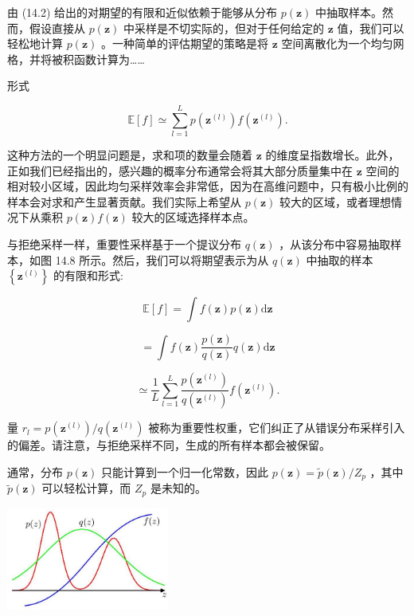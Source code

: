 \documentclass[10pt]{report}
\begin{document}
由 (14.2) 给出的对期望的有限和近似依赖于能够从分布 \(p\left( \mathbf{z}\right)\) 中抽取样本。然而，假设直接从 \(p\left( \mathbf{z}\right)\) 中采样是不切实际的，但对于任何给定的 \(\mathbf{z}\) 值，我们可以轻松地计算 \(p\left( \mathbf{z}\right)\) 。一种简单的评估期望的策略是将 \(\mathbf{z}\) 空间离散化为一个均匀网格，并将被积函数计算为……

形式

\[
\mathbb{E}\left\lbrack  f\right\rbrack   \simeq  \mathop{\sum }\limits_{{l = 1}}^{L}p\left( {\mathbf{z}}^{\left( l\right) }\right) f\left( {\mathbf{z}}^{\left( l\right) }\right) . \tag{14.18}
\]

这种方法的一个明显问题是，求和项的数量会随着 \(\mathbf{z}\) 的维度呈指数增长。此外，正如我们已经指出的，感兴趣的概率分布通常会将其大部分质量集中在 \(\mathbf{z}\) 空间的相对较小区域，因此均匀采样效率会非常低，因为在高维问题中，只有极小比例的样本会对求和产生显著贡献。我们实际上希望从 \(p\left( \mathbf{z}\right)\) 较大的区域，或者理想情况下从乘积 \(p\left( \mathbf{z}\right) f\left( \mathbf{z}\right)\) 较大的区域选择样本点。

与拒绝采样一样，重要性采样基于一个提议分布 \(q\left( \mathbf{z}\right)\) ，从该分布中容易抽取样本，如图 14.8 所示。然后，我们可以将期望表示为从 \(q\left( \mathbf{z}\right)\) 中抽取的样本 \(\left\{  {\mathbf{z}}^{\left( l\right) }\right\}\) 的有限和形式:

\[
\mathbb{E}\left\lbrack  f\right\rbrack   = \int f\left( \mathbf{z}\right) p\left( \mathbf{z}\right) \mathrm{d}\mathbf{z}
\]

\[
= \int f\left( \mathbf{z}\right) \frac{p\left( \mathbf{z}\right) }{q\left( \mathbf{z}\right) }q\left( \mathbf{z}\right) \mathrm{d}\mathbf{z}
\]

\[
\simeq  \frac{1}{L}\mathop{\sum }\limits_{{l = 1}}^{L}\frac{p\left( {\mathbf{z}}^{\left( l\right) }\right) }{q\left( {\mathbf{z}}^{\left( l\right) }\right) }f\left( {\mathbf{z}}^{\left( l\right) }\right) . \tag{14.19}
\]

量 \({r}_{l} = p\left( {\mathbf{z}}^{\left( l\right) }\right) /q\left( {\mathbf{z}}^{\left( l\right) }\right)\) 被称为重要性权重，它们纠正了从错误分布采样引入的偏差。请注意，与拒绝采样不同，生成的所有样本都会被保留。

通常，分布 \(p\left( \mathbf{z}\right)\) 只能计算到一个归一化常数，因此 \(p\left( \mathbf{z}\right)  = \widetilde{p}\left( \mathbf{z}\right) /{Z}_{p}\) ，其中 \(\widetilde{p}\left( \mathbf{z}\right)\) 可以轻松计算，而 \({Z}_{p}\) 是未知的。

\begin{center}
\includegraphics[max width=0.4\textwidth]{images/0194e279-9b28-703a-88f4-c3ac21e2010d_457_1006_346_545_343_0.jpg}
\end{center}
\hspace*{3em} 
\end{document}
